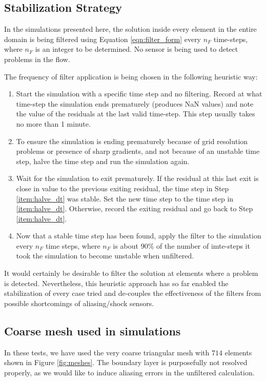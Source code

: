 \subsection{Stabilization Strategy}
In the simulations presented here, the solution inside every element in the entire domain is being filtered using Equation \ref{eqn:filter_form} every $n_F$ time-steps, where $n_F$ is an integer to be determined. No sensor is being used to detect problems in the flow.

The frequency of filter application is being chosen in the following heuristic way:
\begin{enumerate}[1.]
\item \label{item:start}Start the simulation with a specific time step and no filtering. Record at what time-step the simulation ends prematurely (produces NaN values) and note the value of the residuals at the last valid time-step.  This step usually takes no more than 1 minute.
\item \label{item:halve_dt}To ensure the simulation is ending prematurely because of grid resolution problems or presence of sharp gradients, and not because of an unstable time step, halve the time step and run the simulation again.
\item \label{item:check_res} Wait for the simulation to exit prematurely. If the residual at this last exit is close in value to the previous exiting residual, the time step in Step \ref{item:halve_dt} was stable. Set the new time step to the time step in \ref{item:halve_dt}. Otherwise, record the exiting residual and go back to Step \ref{item:halve_dt}.
\item Now that a stable time step has been found, apply the filter to the simulation every $n_F$ time steps, where $n_F$ is about $90\%$ of the number of imte-steps it took the simulation to become unstable when unfiltered.
\end{enumerate}

It would certainly be desirable to filter the solution at elements where a problem is detected. Nevertheless, this heuristic approach has so far enabled the stabilization of every case tried and de-couples the effectiveness of the filters from possible shortcomings of aliasing/shock sensors.

\subsection{Coarse mesh used in simulations}
In these tests, we have used the very coarse triangular mesh with $714$ elements shown in Figure \ref{fig:meshes}. The boundary layer is purposefully not resolved properly, as we would like to induce aliasing errors in the unfiltered calculation.

